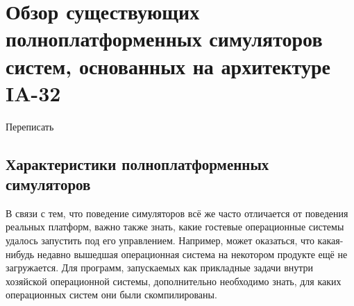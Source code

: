 \chapter[Обзор существующих полноплатформенных симуляторов]{Обзор существующих полноплатформенных симуляторов систем, основанных на архитектуре IA-32}\label{chapter02}


\todo Переписать





\section{Характеристики полноплатформенных симуляторов}


В связи с тем, что поведение симуляторов всё же часто отличается от поведения реальных платформ, важно также знать, какие гостевые операционные системы удалось запустить под его управлением. Например, может оказаться, что какая-нибудь недавно вышедшая операционная система на некотором продукте ещё не загружается. Для программ, запускаемых как прикладные задачи внутри хозяйской операционной системы, дополнительно необходимо знать, для каких операционных систем они были скомпилированы. 

